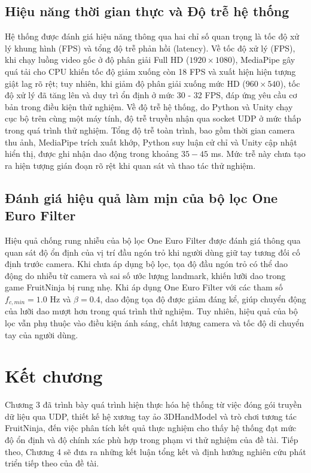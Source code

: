 \documentclass[../BTL.tex]{subfiles}
\begin{document}
\subsection{Hiệu năng thời gian thực và Độ trễ hệ thống}
Hệ thống được đánh giá hiệu năng thông qua hai chỉ số quan trọng là tốc độ xử lý khung hình (FPS) và tổng độ trễ phản hồi (latency). Về tốc độ xử lý (FPS), khi chạy luồng video gốc ở độ phân giải Full HD ($1920 \times 1080$), MediaPipe gây quá tải cho CPU khiến tốc độ giảm xuống còn 18 FPS và xuất hiện hiện tượng giật lag rõ rệt; tuy nhiên, khi giảm độ phân giải xuống mức HD ($960 \times 540$), tốc độ xử lý đã tăng lên và duy trì ổn định ở mức 30 - 32 FPS, đáp ứng yêu cầu cơ bản trong điều kiện thử nghiệm. Về độ trễ hệ thống, do Python và Unity chạy cục bộ trên cùng một máy tính, độ trễ truyền nhận qua socket UDP ở mức thấp trong quá trình thử nghiệm. Tổng độ trễ toàn trình, bao gồm thời gian camera thu ảnh, MediaPipe trích xuất khớp, Python suy luận cử chỉ và Unity cập nhật hiển thị, được ghi nhận dao động trong khoảng $35 - 45$ ms. Mức trễ này chưa tạo ra hiện tượng gián đoạn rõ rệt khi quan sát và thao tác thử nghiệm.

\subsection{Đánh giá hiệu quả làm mịn của bộ lọc One Euro Filter}
Hiệu quả chống rung nhiễu của bộ lọc One Euro Filter được đánh giá thông qua quan sát độ ổn định của vị trí đầu ngón trỏ khi người dùng giữ tay tương đối cố định trước camera. Khi chưa áp dụng bộ lọc, tọa độ đầu ngón trỏ có thể dao động do nhiễu từ camera và sai số ước lượng landmark, khiến lưỡi dao trong game FruitNinja bị rung nhẹ. Khi áp dụng One Euro Filter với các tham số $f_{c,min} = 1.0$ Hz và $\beta = 0.4$, dao động tọa độ được giảm đáng kể, giúp chuyển động của lưỡi dao mượt hơn trong quá trình thử nghiệm. Tuy nhiên, hiệu quả của bộ lọc vẫn phụ thuộc vào điều kiện ánh sáng, chất lượng camera và tốc độ di chuyển tay của người dùng.

\section*{Kết chương}
Chương 3 đã trình bày quá trình hiện thực hóa hệ thống từ việc đóng gói truyền dữ liệu qua UDP, thiết kế hệ xương tay ảo 3DHandModel và trò chơi tương tác FruitNinja, đến việc phân tích kết quả thực nghiệm cho thấy hệ thống đạt mức độ ổn định và độ chính xác phù hợp trong phạm vi thử nghiệm của đề tài. Tiếp theo, Chương 4 sẽ đưa ra những kết luận tổng kết và định hướng nghiên cứu phát triển tiếp theo của đề tài.
\end{document}
